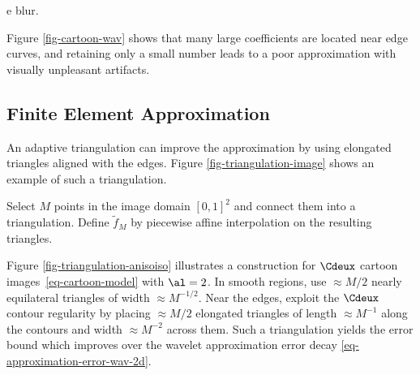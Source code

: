 e blur.

Figure \ref{fig-cartoon-wav} shows that many large coefficients are located near edge curves, and retaining only a small number leads to a poor approximation with visually unpleasant artifacts.



                                        
\subsection{Finite Element Approximation}

An adaptive triangulation can improve the approximation by using elongated triangles aligned with the edges.
Figure \ref{fig-triangulation-image} shows an example of such a triangulation.


Select $M$ points in the image domain $[0,1]^2$ and connect them into a triangulation. Define $\tilde f_M$ by piecewise affine interpolation on the resulting triangles.


Figure \ref{fig-triangulation-anisoiso} illustrates a construction for $\Cdeux$ cartoon images~\eqref{eq-cartoon-model} with $\al=2$. In smooth regions, use $\approx M/2$ nearly equilateral triangles of width $\approx M^{-1/2}$. Near the edges, exploit the $\Cdeux$ contour regularity by placing $\approx M/2$ elongated triangles of length $\approx M^{-1}$ along the contours and width $\approx M^{-2}$ across them. Such a triangulation yields the error bound
which improves over the wavelet approximation error decay \eqref{eq-approximation-error-wav-2d}. 

